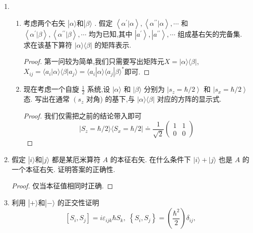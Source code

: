 \begin{enumerate}
\begin{enumerate}
	\end{enumerate}
	\item
	\begin{enumerate}
		\item 考虑两个右矢 $\left| {\alpha \rangle \text{和}}\right| \beta \rangle$ . 假定 $\left\langle {{\alpha }^{\prime } | \alpha }\right\rangle ,\left\langle {{\alpha }^{\prime \prime } | \alpha }\right\rangle ,\cdots$ 和 $\left\langle {{\alpha }^{\prime } | \beta }\right\rangle ,\left\langle {{\alpha }^{\prime \prime } | \beta }\right\rangle ,\cdots$ 均为已知,其中 $\left| {a}^{\prime }\right\rangle ,\left| {a}^{\prime \prime }\right\rangle ,\cdots$ 组成基右矢的完备集. 求在该基下算符 $|\alpha \rangle \langle \beta |$ 的矩阵表示.
		\begin{proof}
			第一问较为简单,我们只需要写出矩阵元$X=|\alpha \rangle \langle \beta |$,$X_{ij}=\langle a_i|\alpha \rangle \langle \beta |a_j\rangle=\langle a_i|\alpha \rangle \langle a_j |\beta\rangle^*$即可.
		\end{proof}
		\item 现在考虑一个自旋 $\frac{1}{2}$ 系统,设 $|\alpha \rangle$ 和 $|\beta \rangle$ 分别为 $\left| {{s}_{z} = \hbar /2}\right\rangle$ 和 $\left| {{s}_{x} = \hbar /2}\right\rangle$ 态. 写出在通常 $\left( {s}_{z}\right.$ 对角) 的基下,与 $\left| {\alpha \rangle \langle \beta }\right|$ 对应的方阵的显示式.
		\begin{proof}
			我们仅需把之前的结论带入即可
			\begin{equation}
				\left.|S_z=\hbar/2\rangle\langle S_x=\hbar/2|\doteq\frac{1}{\sqrt{2}}\left(\begin{array}{cc}1&1\\0&0\end{array}\right.\right)
			\end{equation}
		\end{proof}
	\end{enumerate}
	\item 假定 $\left| {i\rangle \text{和}}\right| j\rangle$ 都是某厄米算符 $A$ 的本征右矢. 在什么条件下 $\left| {i\rangle + }\right| j\rangle$ 也是 $A$ 的一个本征右矢. 证明答案的正确性.
	\begin{proof}
		仅当本征值相同时正确.
	\end{proof}
	\item 利用 $\left| {+\rangle \text{和}}\right| - \rangle$ 的正交性证明
	$$
	\left\lbrack {{S}_{i},{S}_{j}}\right\rbrack = i{\varepsilon }_{ijk}\hbar {S}_{k},\;\left\{ {{S}_{i},{S}_{j}}\right\} = \left( \frac{{\hbar }^{2}}{2}\right) {\delta }_{ij},
$$
\end{enumerate}
